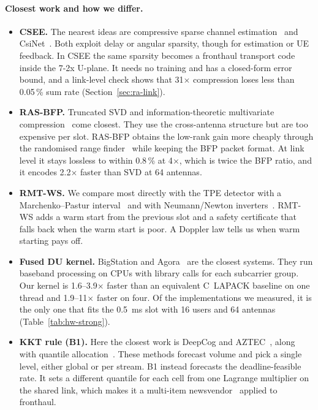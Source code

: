 \paragraph{Closest work and how we differ.}
\begin{itemize}
  \item \textbf{CSEE.} The nearest ideas are compressive sparse channel estimation~\cite{berger2010} and CsiNet~\cite{wen2018}. Both exploit delay or angular sparsity, though for estimation or UE feedback. In CSEE the same sparsity becomes a fronthaul transport code inside the 7-2x U-plane. It needs no training and has a closed-form error bound, and a link-level check shows that 31$\times$ compression loses less than 0.05\,\% sum rate (Section~\ref{sec:ra-link}).
  \item \textbf{RAS-BFP.} Truncated SVD and information-theoretic multivariate compression~\cite{park2014} come closest. They use the cross-antenna structure but are too expensive per slot. RAS-BFP obtains the low-rank gain more cheaply through the randomised range finder~\cite{halko2011} while keeping the BFP packet format. At link level it stays lossless to within 0.8\,\% at 4$\times$, which is twice the BFP ratio, and it encodes 2.2$\times$ faster than SVD at 64 antennas.
  \item \textbf{RMT-WS.} We compare most directly with the TPE detector with a Marchenko--Pastur interval~\cite{kammoun2014} and with Neumann/Newton inverters~\cite{wu2013,shao2016}. RMT-WS adds a warm start from the previous slot and a safety certificate that falls back when the warm start is poor. A Doppler law tells us when warm starting pays off.
  \item \textbf{Fused DU kernel.} BigStation and Agora~\cite{yang2013bigstation,ding2020agora} are the closest systems. They run baseband processing on CPUs with library calls for each subcarrier group. Our kernel is 1.6--3.9$\times$ faster than an equivalent C~LAPACK baseline on one thread and 1.9--11$\times$ faster on four. Of the implementations we measured, it is the only one that fits the 0.5~ms slot with 16 users and 64 antennas (Table~\ref{tab:hw-strong}).
  \item \textbf{KKT rule (B1).} Here the closest work is DeepCog and AZTEC~\cite{bega2019,bega2020}, along with quantile allocation~\cite{kasuluru2024,larumbe2026}. These methods forecast volume and pick a single level, either global or per stream. B1 instead forecasts the deadline-feasible rate. It sets a different quantile for each cell from one Lagrange multiplier on the shared link, which makes it a multi-item newsvendor~\cite{hadley1963} applied to fronthaul.

\end{itemize}
